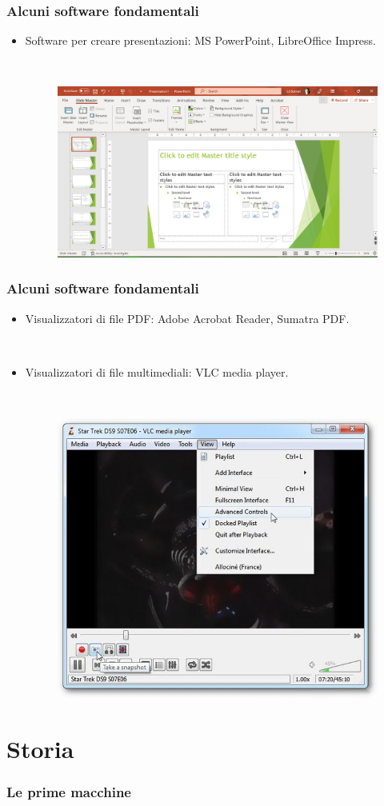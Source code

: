 \documentclass[handout]{beamer}
\begin{document}
\begin{frame}
\frametitle{Alcuni software fondamentali}
\begin{itemize}
  \item Software per creare presentazioni: MS PowerPoint, LibreOffice Impress.
  
  ~

  \begin{figure}
    \includegraphics[width=.9\columnwidth]{img/powerpoint.png}
  \end{figure}
\end{itemize}
\end{frame}

\begin{frame}
\frametitle{Alcuni software fondamentali}
\begin{itemize}
  \item Visualizzatori di file PDF: Adobe Acrobat Reader, Sumatra PDF.
  
  ~

  \item Visualizzatori di file multimediali: VLC media player.
  
  ~

  \begin{figure}
    \includegraphics[width=.5\columnwidth]{img/vlc.jpg}
  \end{figure}
\end{itemize}
\end{frame}

\section{Storia}

\begin{frame}
\frametitle{Le prime macchine}

  

\end{frame}
\end{document}
